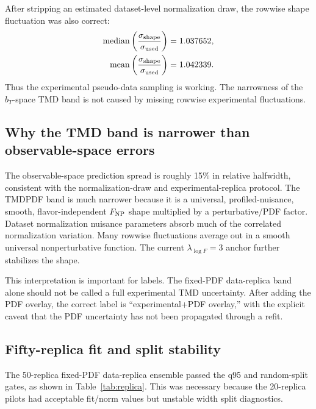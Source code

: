 \documentclass[11pt]{article}
\newcommand{\bt}{b_T}
\newcommand{\FNP}{F_{\rm NP}}
\begin{document}
After stripping an estimated dataset-level normalization draw, the rowwise shape fluctuation was also correct:
\begin{align}
  {\rm median}\left(\frac{\sigma_{\rm shape}}{\sigma_{\rm used}}\right) &= 1.037652,\\
  {\rm mean}\left(\frac{\sigma_{\rm shape}}{\sigma_{\rm used}}\right) &= 1.042339.
\end{align}
Thus the experimental pseudo-data sampling is working.  The narrowness of the $\bt$-space TMD band is not caused by missing rowwise experimental fluctuations.

\subsection{Why the TMD band is narrower than observable-space errors}

The observable-space prediction spread is roughly 15\% in relative halfwidth, consistent with the normalization-draw and experimental-replica protocol.  The TMDPDF band is much narrower because it is a universal, profiled-nuisance, smooth, flavor-independent $\FNP$ shape multiplied by a perturbative/PDF factor.  Dataset normalization nuisance parameters absorb much of the correlated normalization variation.  Many rowwise fluctuations average out in a smooth universal nonperturbative function.  The current $\lambda_{\log F}=3$ anchor further stabilizes the shape.

This interpretation is important for labels.  The fixed-PDF data-replica band alone should not be called a full experimental TMD uncertainty.  After adding the PDF overlay, the correct label is ``experimental+PDF overlay,'' with the explicit caveat that the PDF uncertainty has not been propagated through a refit.

\subsection{Fifty-replica fit and split stability}

The 50-replica fixed-PDF data-replica ensemble passed the q95 and random-split gates, as shown in Table~\ref{tab:replica}.  This was necessary because the 20-replica pilots had acceptable fit/norm values but unstable width split diagnostics.
\end{document}
